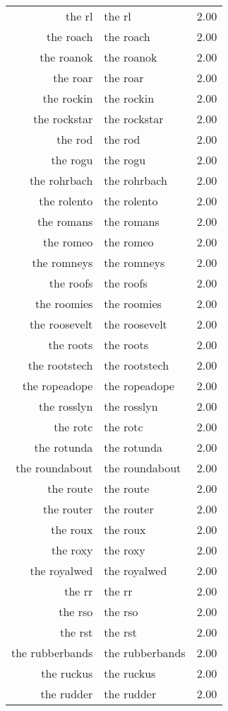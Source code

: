\begin{table}[ht]
\begin{tabular}{rlr}
  the rl & the rl & 2.00 \\ 
  the roach & the roach & 2.00 \\ 
  the roanok & the roanok & 2.00 \\ 
  the roar & the roar & 2.00 \\ 
  the rockin & the rockin & 2.00 \\ 
  the rockstar & the rockstar & 2.00 \\ 
  the rod & the rod & 2.00 \\ 
  the rogu & the rogu & 2.00 \\ 
  the rohrbach & the rohrbach & 2.00 \\ 
  the rolento & the rolento & 2.00 \\ 
  the romans & the romans & 2.00 \\ 
  the romeo & the romeo & 2.00 \\ 
  the romneys & the romneys & 2.00 \\ 
  the roofs & the roofs & 2.00 \\ 
  the roomies & the roomies & 2.00 \\ 
  the roosevelt & the roosevelt & 2.00 \\ 
  the roots & the roots & 2.00 \\ 
  the rootstech & the rootstech & 2.00 \\ 
  the ropeadope & the ropeadope & 2.00 \\ 
  the rosslyn & the rosslyn & 2.00 \\ 
  the rotc & the rotc & 2.00 \\ 
  the rotunda & the rotunda & 2.00 \\ 
  the roundabout & the roundabout & 2.00 \\ 
  the route & the route & 2.00 \\ 
  the router & the router & 2.00 \\ 
  the roux & the roux & 2.00 \\ 
  the roxy & the roxy & 2.00 \\ 
  the royalwed & the royalwed & 2.00 \\ 
  the rr & the rr & 2.00 \\ 
  the rso & the rso & 2.00 \\ 
  the rst & the rst & 2.00 \\ 
  the rubberbands & the rubberbands & 2.00 \\ 
  the ruckus & the ruckus & 2.00 \\ 
  the rudder & the rudder & 2.00 \\ 

\end{tabular}
\end{table}
